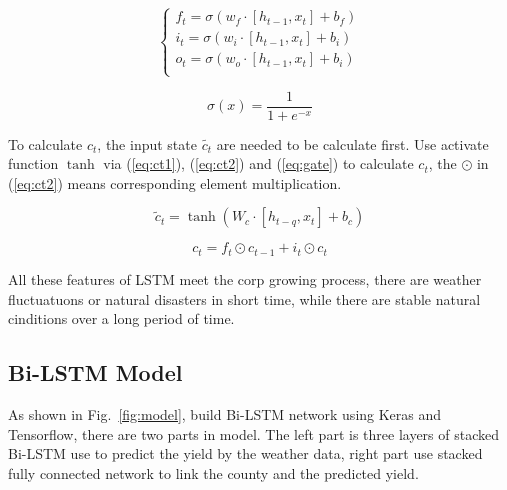 \documentclass[conference]{IEEEtran}
\begin{document}
\begin{equation}
  \begin{cases}	f_t=\sigma \left( w_f\cdot \left[ h_{t-1},x_t \right] +b_f \right)\\	i_t=\sigma \left( w_i\cdot \left[ h_{t-1},x_t \right] +b_i \right)\\	o_t=\sigma \left( w_o\cdot \left[ h_{t-1},x_t \right] +b_i \right)\\\end{cases}
  \label{eq:gate}
\end{equation}

\begin{equation}
  \sigma \left( x \right) =\frac{1}{1+e^{-x}}
  \label{eq:sigmoid}
\end{equation}

To calculate $c_t$, the input state $\widetilde{c_t}$ are needed to be calculate first. Use activate function $\tanh$ via (\ref{eq:ct1}), (\ref{eq:ct2}) and (\ref{eq:gate}) to calculate $c_t$, the $\odot$ in (\ref{eq:ct2}) means corresponding element multiplication.

\begin{equation}
  \tilde{c}_t=\tanh \left( W_c\cdot \left[ h_{t-q},x_t \right] +b_c \right)
  \label{eq:ct1}
\end{equation}

\begin{equation}
  c_t=f_t\odot c_{t-1}+i_t\odot c_t
  \label{eq:ct2}
\end{equation}

All these features of LSTM meet the corp growing process, there are weather fluctuatuons or natural disasters in short time, while there are stable natural cinditions over a long period of time.

\subsection{Bi-LSTM Model}
As shown in Fig.~\ref{fig:model}, build Bi-LSTM network using Keras and Tensorflow, there are two parts in model. The left part is three layers of stacked Bi-LSTM use to predict the yield by the weather data, right part use stacked fully connected network to link the county and the predicted yield.
\end{document}
